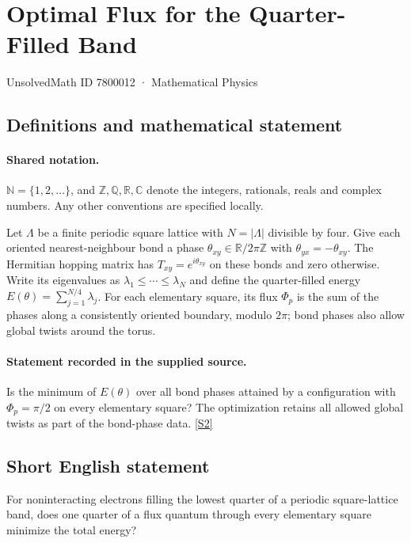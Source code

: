 \documentclass[11pt]{article}
\newcommand{\sref}[2]{\hyperlink{source:#1:#2}{[S#2]}}
\begin{document}
\setcounter{section}{7800011}
\section{Optimal Flux for the Quarter-Filled Band}\label{7800012}
{\small\sffamily UnsolvedMath ID 7800012 · Mathematical Physics}
\subsection{Definitions and mathematical statement}

\paragraph{Shared notation.}$\mathbb N=\{1,2,\ldots\}$, and $\mathbb Z,\mathbb Q,\mathbb R,\mathbb C$ denote the integers, rationals, reals and complex numbers. Any other conventions are specified locally.


Let $\Lambda$ be a finite periodic square lattice with $N=|\Lambda|$ divisible by four. Give each oriented nearest-neighbour bond a phase $\theta_{xy}\in\mathbb R/2\pi\mathbb Z$ with $\theta_{yx}=-\theta_{xy}$. The Hermitian hopping matrix has $T_{xy}=e^{i\theta_{xy}}$ on these bonds and zero otherwise. Write its eigenvalues as $\lambda_1\le\cdots\le\lambda_N$ and define the quarter-filled energy $E(\theta)=\sum_{j=1}^{N/4}\lambda_j$. For each elementary square, its flux $\Phi_p$ is the sum of the phases along a consistently oriented boundary, modulo $2\pi$; bond phases also allow global twists around the torus.
\paragraph{Statement recorded in the supplied source.}
Is the minimum of $E(\theta)$ over all bond phases attained by a configuration with $\Phi_p=\pi/2$ on every elementary square? The optimization retains all allowed global twists as part of the bond-phase data. \sref{7800012}{2}
\subsection{Short English statement}
For noninteracting electrons filling the lowest quarter of a periodic square-lattice band, does one quarter of a flux quantum through every elementary square minimize the total energy?
\end{document}
